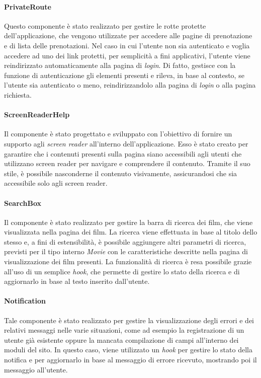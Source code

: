 \paragraph{PrivateRoute}\label{par:privateroute}

Questo componente è stato realizzato per gestire le rotte protette dell'applicazione, che vengono utilizzate per accedere alle pagine di prenotazione e di lista delle prenotazioni.
Nel caso in cui l'utente non sia autenticato e voglia accedere ad uno dei link protetti, per semplicità a fini applicativi,
l'utente viene reindirizzato automaticamente alla pagina di \textit{login}. Di fatto, gestisce con la funzione di autenticazione gli elementi presenti e rileva,
in base al contesto, se l'utente sia autenticato o meno, reindirizzandolo alla pagina di \textit{login} o alla pagina richiesta.

\paragraph{ScreenReaderHelp}\label{par:screenreaderhelp}

Il componente è stato progettato e sviluppato con l'obiettivo di fornire un supporto agli \textit{screen reader} all'interno dell'applicazione. 
Esso è stato creato per garantire che i contenuti presenti sulla pagina siano accessibili agli utenti che utilizzano screen reader per navigare e comprendere il contenuto.
Tramite il suo stile, è possibile nasconderne il contenuto visivamente, assicurandosi che sia accessibile solo agli screen reader.

\paragraph{SearchBox}\label{par:searchbox}

Il componente è stato realizzato per gestire la barra di ricerca dei film, che viene visualizzata nella pagina dei film.
La ricerca viene effettuata in base al titolo dello stesso e, a fini di estensibilità, è possibile aggiungere altri parametri di ricerca, previsti per il tipo interno \textit{Movie}
con le caratteristiche descritte nella pagina di visualizzazione dei film presenti.
La funzionalità di ricerca è resa possibile grazie all'uso di un semplice \textit{hook}, che permette di gestire lo stato della ricerca e di aggiornarlo in base al testo inserito dall'utente.

\paragraph{Notification}\label{par:notification}

Tale componente è stato realizzato per gestire la visualizzazione degli errori e dei relativi messaggi nelle varie situazioni, come ad esempio la registrazione di un utente già esistente
oppure la mancata compilazione di campi all'interno dei moduli del sito. In questo caso, viene utilizzato un \textit{hook} per gestire lo stato della notifica e per aggiornarlo in base al messaggio
di errore ricevuto, mostrando poi il messaggio all'utente.